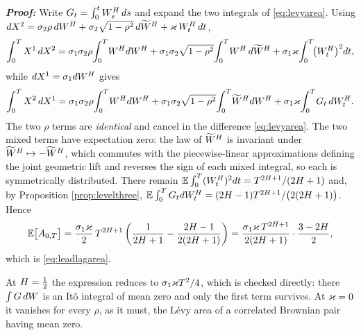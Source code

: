 \textbf{\textit{Proof:}} Write $G_{t}=\int_{0}^{t}W^{H}_{s}\,d s$ and expand the two integrals of
\eqref{eq:levyarea}. Using $d X^{2}=\sigma_{2}\rho\,dW^{H}+\sigma_{2}\sqrt{1-\rho^{2}}\,d\widetilde
W^{H}+\varkappa\,W^{H}_{t}\,d t$,
\[
  \int_{0}^{T}X^{1}\,d X^{2}
  =\sigma_{1}\sigma_{2}\rho\!\int_{0}^{T}\!W^{H}dW^{H}
  +\sigma_{1}\sigma_{2}\sqrt{1-\rho^{2}}\!\int_{0}^{T}\!W^{H}\,d\widetilde W^{H}
  +\sigma_{1}\varkappa\!\int_{0}^{T}\!\bigl(W^{H}_{t}\bigr)^{2}d t,
\]
while $d X^{1}=\sigma_{1}dW^{H}$ gives
\[
  \int_{0}^{T}X^{2}\,d X^{1}
  =\sigma_{1}\sigma_{2}\rho\!\int_{0}^{T}\!W^{H}dW^{H}
  +\sigma_{1}\sigma_{2}\sqrt{1-\rho^{2}}\!\int_{0}^{T}\!\widetilde W^{H}dW^{H}
  +\sigma_{1}\varkappa\!\int_{0}^{T}\!G_{t}\,dW^{H}_{t}.
\]
The two $\rho$ terms are \emph{identical} and cancel in the difference \eqref{eq:levyarea}. The two
mixed terms have expectation zero: the law of $\widetilde W^{H}$ is invariant under
$\widetilde W^{H}\mapsto-\widetilde W^{H}$, which commutes with the piecewise-linear
approximations defining the joint geometric lift and reverses the sign of each mixed integral, so
each is symmetrically distributed. There remain
$\mathbb{E}\int_{0}^{T}(W^{H}_{t})^{2}d t=T^{2H+1}/(2H+1)$ and, by Proposition
\ref{prop:levelthree},
$\mathbb{E}\int_{0}^{T}G_{t}dW^{H}_{t}=(2H-1)T^{2H+1}/\bigl(2(2H+1)\bigr)$. Hence
\[
  \mathbb{E}\bigl[A_{0,T}\bigr]
  =\frac{\sigma_{1}\varkappa}{2}\,T^{2H+1}\left(\frac{1}{2H+1}-\frac{2H-1}{2(2H+1)}\right)
  =\frac{\sigma_{1}\varkappa\,T^{2H+1}}{2(2H+1)}\cdot\frac{3-2H}{2},
\]
which is \eqref{eq:leadlagarea}. \qedfilledtext

\medskip

At $H=\tfrac12$ the expression reduces to $\sigma_{1}\varkappa T^{2}/4$, which is checked
directly: there $\int G\,dW$ is an Itô integral of mean zero and only the first term survives.
At $\varkappa=0$ it vanishes for every $\rho$, as it must, the L\'evy area of a correlated Brownian pair
having mean zero.

